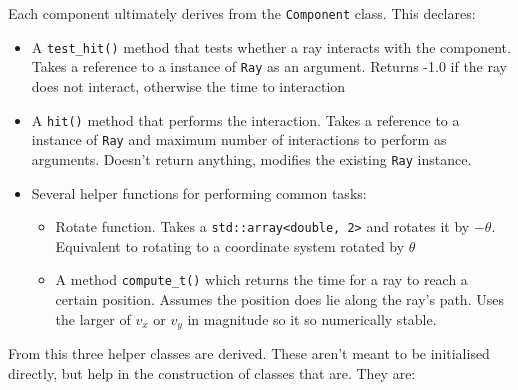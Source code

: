 \documentclass{article}
\begin{document}
Each component ultimately derives from the \texttt{Component} class. This declares:
\begin{itemize}
    \item A \texttt{test\_hit()} method that tests whether a ray interacts with the component. Takes a reference to a instance of \texttt{Ray} as an argument. Returns -1.0 if the ray does not interact, otherwise the time to interaction
    \item A \texttt{hit()} method that performs the interaction. Takes a reference to a instance of \texttt{Ray} and maximum number of interactions to perform as arguments. Doesn't return anything, modifies the existing \texttt{Ray} instance.
    \item Several helper functions for performing common tasks:
    \begin{itemize}
        \item Rotate function. Takes a \texttt{std::array<double, 2>} and rotates it by $-\theta$. Equivalent to rotating to a coordinate system rotated by $\theta$
        \item A method \texttt{compute\_t()} which returns the time for a ray to reach a certain position. Assumes the position does lie along the ray's path. Uses the larger of $v_x$ or $v_y$ in magnitude so it so numerically stable.
    \end{itemize}
\end{itemize}
From this three helper classes are derived. These aren't meant to be initialised directly, but help in the construction of classes that are. They are:
\end{document}
